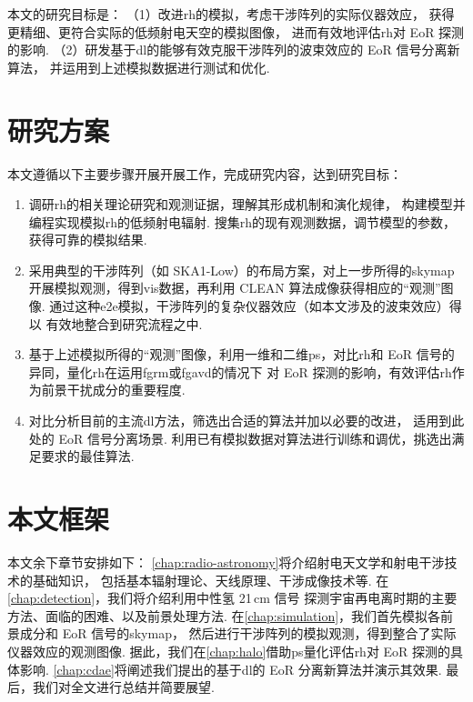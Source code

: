 本文的研究目标是：
（1）改进\ac{rh}的模拟，考虑干涉阵列的实际仪器效应，
获得更精细、更符合实际的低频射电天空的模拟图像，
进而有效地评估\ac{rh}对 EoR 探测的影响.
（2）研发基于\ac{dl}的能够有效克服干涉阵列的波束效应的 EoR 信号分离新算法，
并运用到上述模拟数据进行测试和优化.


\section{研究方案}
\label{sec:plan}

本文遵循以下主要步骤开展开展工作，完成研究内容，达到研究目标：
\begin{enumerate}
\item
调研\ac{rh}的相关理论研究和观测证据，理解其形成机制和演化规律，
构建模型并编程实现模拟\ac{rh}的低频射电辐射.
搜集\ac{rh}的现有观测数据，调节模型的参数，获得可靠的模拟结果.

\item
采用典型的干涉阵列（如 SKA1-Low）的布局方案，对上一步所得的\ac{skymap}
开展模拟观测，得到\ac{vis}数据，再利用 CLEAN 算法成像获得相应的“观测”图像.
通过这种\ac{e2e}模拟，干涉阵列的复杂仪器效应（如本文涉及的波束效应）得以
有效地整合到研究流程之中.

\item
基于上述模拟所得的“观测”图像，利用一维和二维\ac{ps}，对比\ac{rh}和
EoR 信号的异同，量化\ac{rh}在运用\ac{fgrm}或\ac{fgavd}的情况下
对 EoR 探测的影响，有效评估\ac{rh}作为前景干扰成分的重要程度.

\item
对比分析目前的主流\ac{dl}方法，筛选出合适的算法并加以必要的改进，
适用到此处的 EoR 信号分离场景.
利用已有模拟数据对算法进行训练和调优，挑选出满足要求的最佳算法.

\end{enumerate}


\section{本文框架}
\label{sec:structure}

本文余下章节安排如下：
\autoref{chap:radio-astronomy}将介绍射电天文学和射电干涉技术的基础知识，
包括基本辐射理论、天线原理、干涉成像技术等.
在\autoref{chap:detection}，我们将介绍利用中性氢 21\,cm 信号
探测宇宙再电离时期的主要方法、面临的困难、以及前景处理方法.
在\autoref{chap:simulation}，我们首先模拟各前景成分和 EoR 信号的\ac{skymap}，
然后进行干涉阵列的模拟观测，得到整合了实际仪器效应的观测图像.
据此，我们在\autoref{chap:halo}借助\ac{ps}量化评估\ac{rh}对
EoR 探测的具体影响.
\autoref{chap:cdae}将阐述我们提出的基于\ac{dl}的 EoR 分离新算法并演示其效果.
最后，我们对全文进行总结并简要展望.

